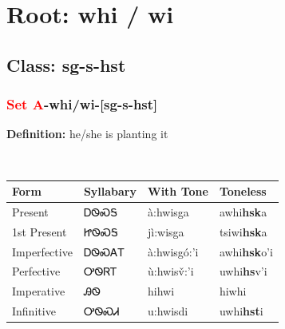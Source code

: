 \needspace{4in}
\section*{Root: whi / wi}
\nopagebreak
{}
\needspace{3in}
\subsection*{Class: sg-s-hst}
\nopagebreak
\needspace{2in}
\subsubsection*{\textcolor{Red}{Set A}{-}\textbf{whi/wi}{-}[sg-s-hst]}
\nopagebreak
\textbf{Definition: } he/she is planting it
\\[0.5em]
\begin{tabularx}{\textwidth}{l X X X}%
\toprule%
\textbf{Form}&\textbf{Syllabary}&\textbf{With Tone}&\textbf{Toneless}\\%
\midrule%
Present&ᎠᏫᏍᎦ&à:hwisga&awhi\textbf{hsk}a\\%
1st Present&ᏥᏫᏍᎦ&jì:wisga&tsiwi\textbf{hsk}a\\%
Imperfective&ᎠᏫᏍᎪᎢ&à:hwisgó:’i&awhi\textbf{hsk}o'i\\%
Perfective&ᎤᏫᏒᎢ&ù:hwisv̌:’i&uwhi\textbf{hs}v'i\\%
Imperative&ᎯᏫ&hihwi&hiwhi\textbf{}\\%
Infinitive&ᎤᏫᏍᏗ&u:hwisdi&uwhi\textbf{hst}i\\%
\bottomrule%
\end{tabularx}
\\[1em]